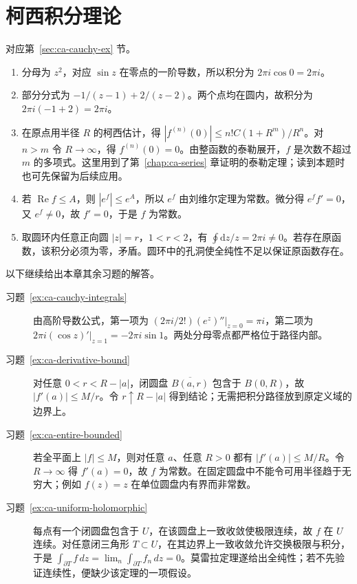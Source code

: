\section{柯西积分理论}
对应第~\ref{sec:ca-cauchy-ex} 节。
\begin{enumerate}
 \item 分母为 $z^2$，对应 $\sin z$ 在零点的一阶导数，所以积分为 $2\pi i\cos0=2\pi i$。
 \item 部分分式为 $-1/(z-1)+2/(z-2)$。两个点均在圆内，故积分为 $2\pi i(-1+2)=2\pi i$。
 \item 在原点用半径 $R$ 的柯西估计，得 $|f^{(n)}(0)|\le n!C(1+R^m)/R^n$。对 $n>m$ 令 $R\to\infty$，得 $f^{(n)}(0)=0$。由整函数的泰勒展开，$f$ 是次数不超过 $m$ 的多项式。这里用到了第~\ref{chap:ca-series} 章证明的泰勒定理；读到本题时也可先保留为后续应用。
 \item 若 $\operatorname{Re}f\le A$，则 $|e^f|\le e^A$，所以 $e^f$ 由刘维尔定理为常数。微分得 $e^ff'=0$，又 $e^f\ne0$，故 $f'=0$，于是 $f$ 为常数。
 \item 取圆环内任意正向圆 $|z|=r$，$1<r<2$，有 $\oint\mathrm dz/z=2\pi i\ne0$。若存在原函数，该积分必须为零，矛盾。圆环中的孔洞使全纯性不足以保证原函数存在。
\end{enumerate}

以下继续给出本章其余习题的解答。
\begin{description}
 \item[习题~\ref{ex:ca-cauchy-integrals}]
 由高阶导数公式，第一项为 $(2\pi i/2!)(e^z)''|_{z=0}=\pi i$，第二项为 $2\pi i(\cos z)'|_{z=1}=-2\pi i\sin1$。两处分母零点都严格位于路径内部。
 \item[习题~\ref{ex:ca-derivative-bound}]
 对任意 $0<r<R-|a|$，闭圆盘 $\overline{B(a,r)}$ 包含于 $B(0,R)$，故 $|f'(a)|\le M/r$。令 $r\uparrow R-|a|$ 得到结论；无需把积分路径放到原定义域的边界上。
 \item[习题~\ref{ex:ca-entire-bounded}]
 若全平面上 $|f|\le M$，则对任意 $a$、任意 $R>0$ 都有 $|f'(a)|\le M/R$。令 $R\to\infty$ 得 $f'(a)=0$，故 $f$ 为常数。在固定圆盘中不能令可用半径趋于无穷大；例如 $f(z)=z$ 在单位圆盘内有界而非常数。
 \item[习题~\ref{ex:ca-uniform-holomorphic}]
 每点有一个闭圆盘包含于 $U$，在该圆盘上一致收敛使极限连续，故 $f$ 在 $U$ 连续。对任意闭三角形 $T\subset U$，在其边界上一致收敛允许交换极限与积分，于是 $\int_{\partial T}f\,dz=\lim_n\int_{\partial T}f_n\,dz=0$。莫雷拉定理遂给出全纯性；若不先验证连续性，便缺少该定理的一项假设。
\end{description}



